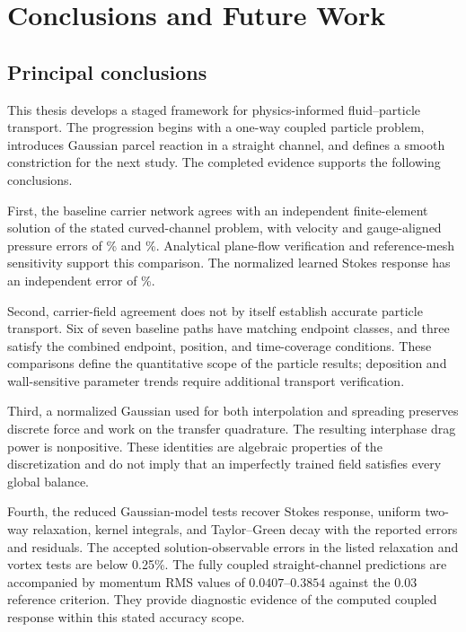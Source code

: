 \chapter{Conclusions and Future Work}\label{ch:conclusions}

\section{Principal conclusions}
This thesis develops a staged framework for physics-informed
fluid--particle transport. The progression begins with a one-way coupled
particle problem, introduces Gaussian parcel reaction in a straight
channel, and defines a smooth constriction for the next study. The
completed evidence supports the following conclusions.

First, the baseline carrier network agrees with an independent
finite-element solution of the stated curved-channel problem, with velocity
and gauge-aligned pressure errors of \FlowVelocity\% and
\FlowPressure\%. Analytical plane-flow verification and reference-mesh
sensitivity support this comparison. The normalized learned Stokes
response has an independent error of \DragError\%.

Second, carrier-field agreement does not by itself establish accurate
particle transport. Six of seven baseline paths have matching endpoint
classes, and three satisfy the combined endpoint, position, and
time-coverage conditions. These comparisons define the quantitative
scope of the particle results; deposition and wall-sensitive parameter
trends require additional transport verification.

Third, a normalized Gaussian used for both interpolation and spreading
preserves discrete force and work on the transfer quadrature. The resulting
interphase drag power is nonpositive. These identities are algebraic
properties of the discretization and do not imply that an imperfectly
trained field satisfies every global balance.

Fourth, the reduced Gaussian-model tests recover Stokes response, uniform
two-way relaxation, kernel integrals, and Taylor--Green decay with the
reported errors and residuals. The accepted solution-observable errors
in the listed relaxation and vortex tests are below 0.25\%. The fully
coupled straight-channel predictions are accompanied by momentum RMS
values of $0.0407$--$0.3854$ against the $0.03$ reference criterion.
They provide diagnostic evidence of the computed coupled response within
this stated accuracy scope.

